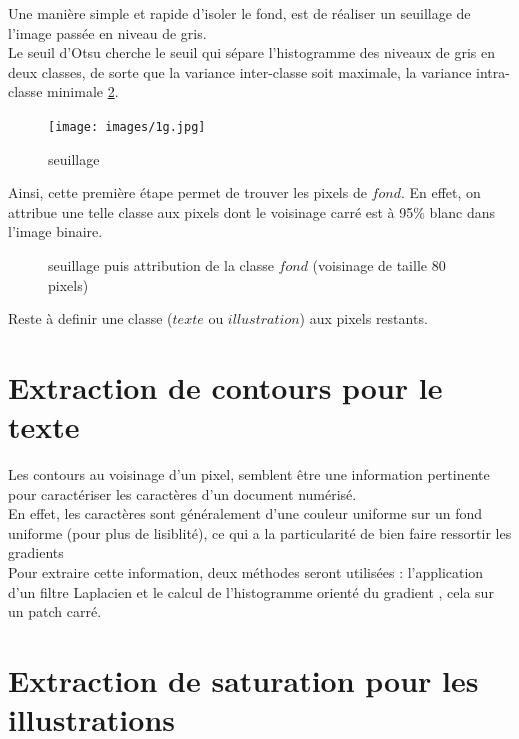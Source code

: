 \documentclass{book}
\begin{document}
Une manière simple et rapide d'isoler le fond, est de réaliser un seuillage de l'image passée en niveau de gris.\\
Le seuil d'Otsu cherche le seuil qui sépare l'histogramme des niveaux de gris en deux classes, de sorte que la variance inter-classe soit maximale, la variance intra-classe
minimale \ref{seuillage}.\\

\begin{figure}[H]
\begin{center}
\texttt{[image: images/1g.jpg]}
\end{center}
\caption{seuillage}
\label{seuillage}
\end{figure}

Ainsi, cette première étape permet de trouver les pixels de $fond$. En effet, on attribue une telle classe aux pixels dont le voisinage carré est à 95\% blanc 
dans l'image binaire.

\begin{figure}[H]
\begin{center}
\end{center}
\caption{seuillage puis attribution de la classe $fond$ (voisinage de taille 80 pixels)}
\label{seuillage}
\end{figure}

Reste à definir une classe ($texte$ ou $illustration$) aux pixels restants.

\section{Extraction de contours pour le texte}

Les contours au voisinage d'un pixel, semblent être une information pertinente pour caractériser les caractères d'un document numérisé.\\
En effet, les caractères sont généralement d'une couleur uniforme sur un fond uniforme (pour plus de lisiblité), ce qui a la 
particularité de bien faire ressortir les gradients\\
Pour extraire cette information, deux méthodes seront utilisées : l'application d'un filtre Laplacien et le calcul de l'histogramme orienté du gradient 
\cite{Dalal05histogramsof}, cela sur un patch carré. 

\section{Extraction de saturation pour les illustrations}
\end{document}
